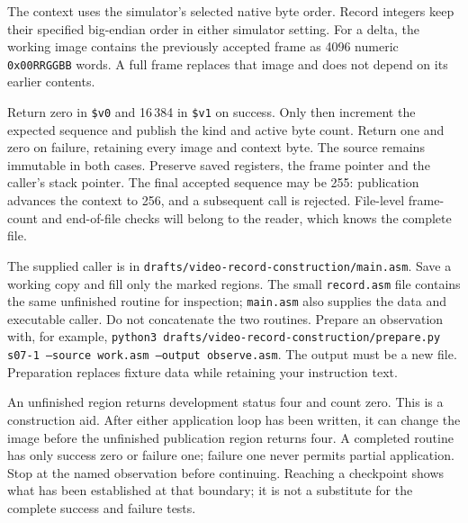 The context uses the simulator's selected native byte order. Record integers keep
their specified big-endian order in either simulator setting. For a delta, the
working image contains the previously accepted frame as 4096 numeric
\texttt{0x00RRGGBB} words. A full frame replaces that image and does not depend on
its earlier contents.

Return zero in \texttt{\$v0} and 16\,384 in \texttt{\$v1} on success. Only then
increment the expected sequence and publish the kind and active byte count. Return
one and zero on failure, retaining every image and context byte. The source remains
immutable in both cases. Preserve saved registers, the frame pointer and the
caller's stack pointer. The final accepted sequence may be 255: publication advances
the context to 256, and a subsequent call is rejected. File-level frame-count and
end-of-file checks will belong to the reader, which knows the complete file.

The supplied caller is in \texttt{drafts/video-record-construction/main.asm}. Save
a working copy and fill only the marked regions. The small
\texttt{record.asm} file contains the same unfinished routine for inspection;
\texttt{main.asm} also supplies the data and executable caller. Do not concatenate
the two routines. Prepare an observation with, for example,
\texttt{python3 drafts/video-record-construction/prepare.py s07-1 --source work.asm
  --output observe.asm}. The output must be a new file. Preparation replaces fixture
data while retaining your instruction text.

An unfinished region returns development status four and count zero. This is a
construction aid. After either application loop has been written, it can change the
image before the unfinished publication region returns four. A completed routine
has only success zero or failure one; failure one never permits partial application.
Stop at the named observation before continuing. Reaching a checkpoint shows what
has been established at that boundary; it is not a substitute for the complete
success and failure tests.

